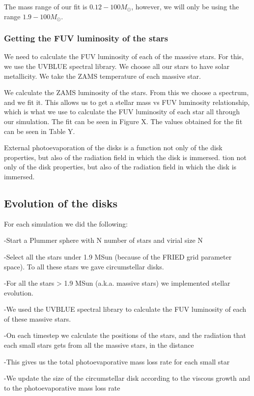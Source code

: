 \documentclass[fleqn,usenatbib]{mnras}
\begin{document}
The mass range of our fit is $0.12 - 100 M_{\odot}$, however, we will only be using the range $1.9 - 100 M_{\odot}$. 

\subsubsection{Getting the FUV luminosity of the stars}
We need to calculate the FUV luminosity of each of the massive stars. For this, we use the UVBLUE spectral library. We choose all our stars to have solar metallicity. We take the ZAMS temperature of each massive star.

We calculate the ZAMS luminosity of the stars. From this we choose a spectrum, and we fit it. This allows us to get a stellar mass vs FUV luminosity relationship, which is what we use to calculate the FUV luminosity of each star all through our simulation. The fit can be seen in Figure X. The values obtained for the fit can be seen in Table Y.

External photoevaporation of the disks is a function not only of the disk properties, but also of the radiation field in which the disk is immersed. tion not only of the disk properties, but also of the radiation field in which the disk is immersed. 

\subsection{Evolution of the disks}
For each simulation we did the following:

-Start a Plummer sphere with N number of stars and virial size N

-Select all the stars under 1.9 MSun (because of the FRIED grid parameter space). To all these stars we gave circumstellar disks.

-For all the stars > 1.9 MSun (a.k.a. massive stars) we implemented stellar evolution.

-We used the UVBLUE spectral library to calculate the FUV luminosity of each of these massive stars.

-On each timestep we calculate the positions of the stars, and the radiation that each small stars gets from all the massive stars, in the distance

-This gives us the total photoevaporative mass loss rate for each small star

-We update the size of the circumstellar disk according to the viscous growth and to the photoevaporative mass loss rate
\end{document}
